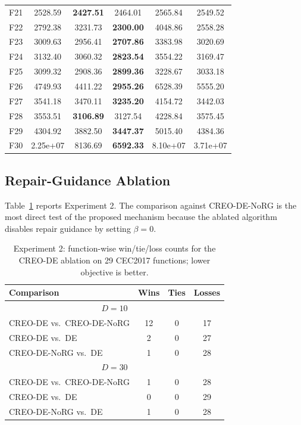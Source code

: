 \documentclass[a4paper,fleqn]{cas-sc}
\begin{document}
\begin{table}[t]
{\begin{tabular}{lccccc}
F21 & 2528.59 & \textbf{2427.51} & 2464.01 & 2565.84 & 2549.52 \\
F22 & 2792.38 & 3231.73 & \textbf{2300.00} & 4048.86 & 2558.28 \\
F23 & 3009.63 & 2956.41 & \textbf{2707.86} & 3383.98 & 3020.69 \\
F24 & 3132.40 & 3060.32 & \textbf{2823.54} & 3554.22 & 3169.47 \\
F25 & 3099.32 & 2908.36 & \textbf{2899.36} & 3228.67 & 3033.18 \\
F26 & 4749.93 & 4411.22 & \textbf{2955.26} & 6528.39 & 5555.20 \\
F27 & 3541.18 & 3470.11 & \textbf{3235.20} & 4154.72 & 3442.03 \\
F28 & 3553.51 & \textbf{3106.89} & 3127.54 & 4228.84 & 3575.45 \\
F29 & 4304.92 & 3882.50 & \textbf{3447.37} & 5015.40 & 4384.36 \\
F30 & 2.25e+07 & 8136.69 & \textbf{6592.33} & 8.10e+07 & 3.71e+07 \\
\bottomrule
\end{tabular}}
\end{table}

\subsection{Repair-Guidance Ablation}
\label{sec:ablation}

Table~\ref{tab:ablation} reports Experiment 2. The comparison against CREO-DE-NoRG is the most direct test of the proposed mechanism because the ablated algorithm disables repair guidance by setting $\beta=0$.

\begin{table}[H]
\centering
\caption{Experiment 2: function-wise win/tie/loss counts for the CREO-DE ablation on 29 CEC2017 functions; lower objective is better.}
\label{tab:ablation}
\small
\begin{tabular}{lccc}
\toprule
Comparison & Wins & Ties & Losses\\
\midrule
\multicolumn{4}{c}{$D=10$}\\
CREO-DE vs.\ CREO-DE-NoRG & 12 & 0 & 17\\
CREO-DE vs.\ DE            & 2  & 0 & 27\\
CREO-DE-NoRG vs.\ DE       & 1  & 0 & 28\\
\midrule
\multicolumn{4}{c}{$D=30$}\\
CREO-DE vs.\ CREO-DE-NoRG & 1  & 0 & 28\\
CREO-DE vs.\ DE            & 0  & 0 & 29\\
CREO-DE-NoRG vs.\ DE       & 1  & 0 & 28\\
\bottomrule
\end{tabular}
\end{table}
\end{document}
